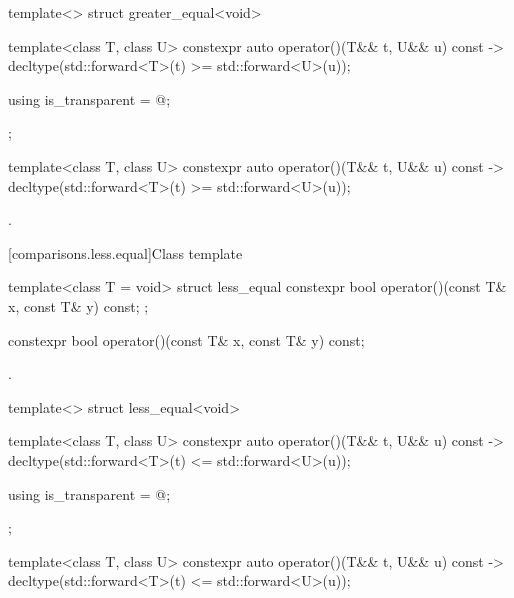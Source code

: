 %
\begin{itemdecl}
template<> struct greater_equal<void> {
  template<class T, class U> constexpr auto operator()(T&& t, U&& u) const
    -> decltype(std::forward<T>(t) >= std::forward<U>(u));

  using is_transparent = @\unspec@;
};
\end{itemdecl}

%
\begin{itemdecl}
template<class T, class U> constexpr auto operator()(T&& t, U&& u) const
    -> decltype(std::forward<T>(t) >= std::forward<U>(u));
\end{itemdecl}

\begin{itemdescr}
\pnum
\returns
{}.
\end{itemdescr}

[comparisons.less.equal]{Class template }

%
\begin{itemdecl}
template<class T = void> struct less_equal {
  constexpr bool operator()(const T& x, const T& y) const;
};
\end{itemdecl}

%
\begin{itemdecl}
constexpr bool operator()(const T& x, const T& y) const;
\end{itemdecl}

\begin{itemdescr}
\pnum
\returns
{}.
\end{itemdescr}

%
\begin{itemdecl}
template<> struct less_equal<void> {
  template<class T, class U> constexpr auto operator()(T&& t, U&& u) const
    -> decltype(std::forward<T>(t) <= std::forward<U>(u));

  using is_transparent = @\unspec@;
};
\end{itemdecl}

%
\begin{itemdecl}
template<class T, class U> constexpr auto operator()(T&& t, U&& u) const
    -> decltype(std::forward<T>(t) <= std::forward<U>(u));
\end{itemdecl}

